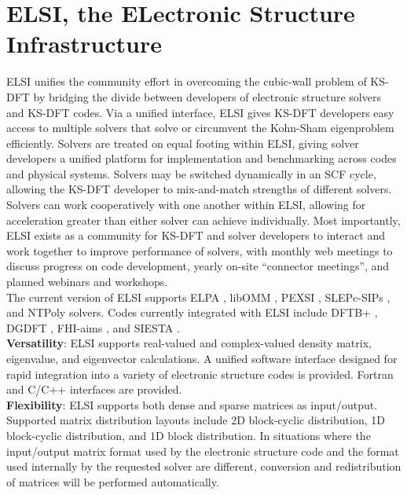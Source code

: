 \documentclass{report}
\begin{document}
\section{ELSI, the ELectronic Structure Infrastructure}
\label{sec:elsi}
ELSI unifies the community effort in overcoming the cubic-wall problem of KS-DFT by bridging the divide between developers of electronic structure solvers and KS-DFT codes.  Via a unified interface, ELSI gives KS-DFT developers easy access to multiple solvers that solve or circumvent the Kohn-Sham eigenproblem efficiently.  Solvers are treated on equal footing within ELSI, giving solver developers a unified platform for implementation and benchmarking across codes and physical systems.  Solvers may be switched dynamically in an SCF cycle, allowing the KS-DFT developer to mix-and-match strengths of different solvers.  Solvers can work cooperatively with one another within ELSI, allowing for acceleration greater than either solver can achieve individually.  Most importantly, ELSI exists as a community for KS-DFT and solver developers to interact and work together to improve performance of solvers, with monthly web meetings to discuss progress on code development, yearly on-site ``connector meetings'', and planned webinars and workshops.\\

The current version of ELSI supports ELPA \cite{elpa_auckenthaler_2011,elpa_marek_2014}, libOMM \cite{libomm_corsetti_2014}, PEXSI \cite{pexsi_lin_2009,pexsi_lin_2013}, SLEPc-SIPs \cite{slepc_hernandez_2005,sips_keceli_2016}, and NTPoly \cite{ntpoly_dawson_2018} solvers.  Codes currently integrated with ELSI include DFTB+ \cite{dftb+_aradi_2007}, DGDFT \cite{dgdft_hu_2015}, FHI-aims \cite{aims_blum_2009}, and SIESTA \cite{siesta_soler_2002}.\\

\textbf{Versatility}:  ELSI supports real-valued and complex-valued density matrix, eigenvalue, and eigenvector calculations.  A unified software interface designed for rapid integration into a variety of electronic structure codes is provided.  Fortran and C/C++ interfaces are provided.\\

\textbf{Flexibility}:  ELSI supports both dense and sparse matrices as input/output.  Supported matrix distribution layouts include 2D block-cyclic distribution, 1D block-cyclic distribution, and 1D block distribution.  In situations where the input/output matrix format used by the electronic structure code and the format used internally by the requested solver are different, conversion and redistribution of matrices will be performed automatically.\\
\end{document}

